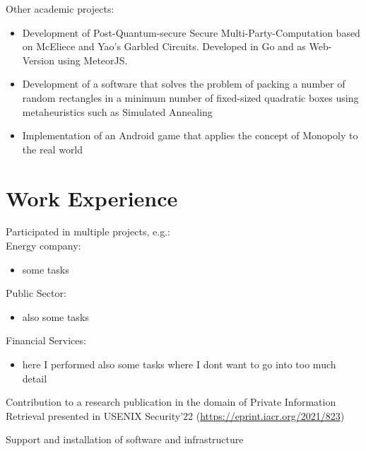 \documentclass[12pt]{nice_cv}
\begin{document}
Other academic projects:
\begin{itemize}[topsep=2pt,itemsep=0pt,partopsep=0pt, parsep=2pt]
	\item {Development of Post-Quantum-secure Secure Multi-Party-Computation based on McEliece and Yao's Garbled Circuits. Developed in Go and as Web-Version using MeteorJS.}
	\item {Development of a software that solves the problem of packing a number of random rectangles in a minimum number of fixed-sized quadratic boxes using metaheuristics such as Simulated Annealing}
	\item {Implementation of an Android game that applies the concept of Monopoly to the real world}
\end{itemize}
\section{Work Experience}
Participated in multiple projects, e.g.:\\
Energy company:
\begin{itemize}[topsep=2pt,itemsep=0pt,partopsep=0pt, parsep=2pt]
	\item{some tasks}
\end{itemize}

Public Sector:
\begin{itemize}[topsep=2pt,itemsep=0pt,partopsep=0pt, parsep=2pt]
	\item{also some tasks}
\end{itemize}

Financial Services:
\begin{itemize}[topsep=2pt,itemsep=0pt,partopsep=0pt, parsep=2pt]
	\item{here I performed also some tasks where I dont want to go into too much detail}
\end{itemize}


Contribution to a research publication in the domain of Private Information Retrieval presented in USENIX Security'22 (\url{https://eprint.iacr.org/2021/823})

\separator
{}

Support and installation of software and infrastructure
\end{document}
